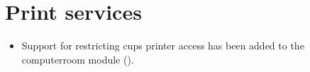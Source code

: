 
 




%

\section{Print services}
\begin{itemize}
\item Support for restricting cups printer access has been added to the computerroom module ().
\end{itemize}

